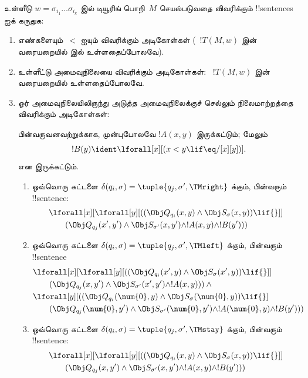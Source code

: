 \documentclass[../../../include/open-logic-section]{subfiles}
\begin{document}
உள்ளீடு $w = \sigma_{i_1}\dots\sigma_{i_k}$ இல் டியூரிங் பொறி~$M$
செயல்படுவதை விவரிக்கும் !!{sentence}s ஐக் கருதுக:
\begin{enumerate}
\item எண்களையும்~$<$ ஐயும் விவரிக்கும் அடிகோள்கள்
(~$!T(M,w)$ இன் வரையறையில்  இல் உள்ளதைப்போலவே).
\item உள்ளீட்டு அமைவுநிலையை விவரிக்கும் அடிகோள்கள்:
~$!T(M,w)$ இன் வரையறையில் உள்ளதைப்போலவே.
\item ஓர் அமைவுநிலையிலிருந்து அடுத்த அமைவுநிலைக்குச் செல்லும்
  நிலைமாற்றத்தை விவரிக்கும் அடிகோள்கள்:

பின்வருவனவற்றுக்காக, முன்புபோலவே $!A(x, y)$ இருக்கட்டும்; மேலும்
\[
  !B(y) \ident \lforall[x][(x < y \lif \eq/[x][y])].
\]
என இருக்கட்டும்.
\begin{enumerate}
\item {} ஒவ்வொரு கட்டளை $\delta(q_i, \sigma) =
  \tuple{q_j, \sigma', \TMright}$ க்கும், பின்வரும் !!{sentence}:
\begin{align*}
& \lforall[x][\lforall[y][(
   (\Obj Q_{q_i}(x, y) \land \Obj S_{\sigma}(x, y)) \lif {}]] \\
&\qquad   (\Obj Q_{q_j}(x', y') \land \Obj S_{\sigma'}(x, y') \land
!A(x, y) \land !B(y')))
\end{align*}
\item {} ஒவ்வொரு கட்டளை $\delta(q_i, \sigma) =
  \tuple{q_j, \sigma', \TMleft}$ க்கும், பின்வரும் !!{sentence}
\begin{align*}
& \lforall[x][\lforall[y][
    ((\Obj Q_{q_i}(x', y) \land \Obj S_{\sigma}(x', y)) \lif {}]]\\
& \qquad   (\Obj Q_{q_j}(x, y') \land \Obj S_{\sigma'}(x', y') \land
!A(x, y))) \land {}\\
& \lforall[y][((\Obj Q_{q_i}(\num{0}, y) \land \Obj S_{\sigma}(\num{0},
    y)) \lif {}]\\
& \qquad (\Obj Q_{q_j}(\num{0}, y') \land \Obj S_{\sigma'}(\num{0},
  y') \land !A(\num{0}, y) \land !B(y')))
\end{align*}
\item {} ஒவ்வொரு கட்டளை $\delta(q_i, \sigma) =
  \tuple{q_j, \sigma', \TMstay}$ க்கும், பின்வரும் !!{sentence}:
\begin{align*}
& \lforall[x][\lforall[y][(
   (\Obj Q_{q_i}(x, y) \land \Obj S_{\sigma}(x, y)) \lif {}]] \\
&\qquad (\Obj Q_{q_j}(x, y') \land \Obj S_{\sigma'}(x, y') \land
!A(x, y) \land !B(y')))
\end{align*}

\end{enumerate}
\end{enumerate}
\end{document}
